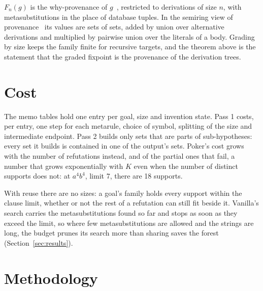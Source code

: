 \documentclass[11pt]{article}
\newcommand{\F}{F}
\begin{document}
$\F_n(g)$ is the why-provenance of $g$~\cite{bkt}, restricted
to derivations of size $n$, with metasubstitutions in the place of database tuples.
In the semiring view of provenance~\cite{gkt} its
values are sets of sets, added by union over alternative derivations and multiplied
by pairwise union over the literals of a body. Grading by size keeps the family
finite for recursive targets, and the theorem above is the statement that the graded
fixpoint is the provenance of the derivation trees.

\section{Cost}

The memo tables hold one entry per goal, size and invention state. Pass 1 costs,
per entry, one step for each metarule, choice of symbol, splitting of the size and
intermediate endpoint. Pass 2 builds only sets that are parts of sub-hypotheses:
every set it builds is contained in one of the output's sets. Poker's cost grows with
the number of refutations instead, and of the partial ones that fail, a number that
grows exponentially with $K$ even when the number of distinct supports does not: at
$a^4b^4$, limit 7, there are 18 supports.

With reuse there are no sizes: a goal's family holds every support within the clause
limit, whether or not the rest of a refutation can still fit beside it. Vanilla's
search carries the metasubstitutions found so far and stops as soon as they exceed
the limit, so where few metasubstitutions are allowed and the strings are long, the
budget prunes its search more than sharing saves the forest
(Section~\ref{sec:results}).

\section{Methodology}\label{sec:method}
\end{document}
